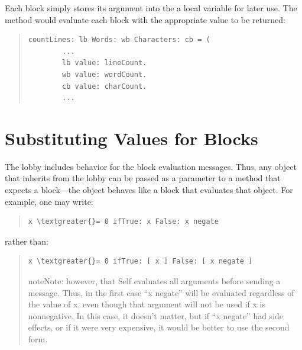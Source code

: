 \documentclass[letterpaper,10pt,english]{sphinxmanual}
\begin{document}
Each block simply stores its argument into the a local variable for later use. The
 method would evaluate each block with the appropriate
value to be returned:
\begin{quote}

\begin{Verbatim}[commandchars=\\\{\}]
countLines: lb Words: wb Characters: cb = (
        ...
        lb value: lineCount.
        wb value: wordCount.
        cb value: charCount.
        ...
\end{Verbatim}
\end{quote}


\section{Substituting Values for Blocks}
\label{progguid:substituting-values-for-blocks}
The lobby includes behavior for the block evaluation messages. Thus, any object that inherits from
the lobby can be passed as a parameter to a method that expects a block—the object behaves like
a block that evaluates that object. For example, one may write:
\begin{quote}

\begin{Verbatim}[commandchars=\\\{\}]
x \textgreater{}= 0 ifTrue: x False: x negate
\end{Verbatim}
\end{quote}

rather than:
\begin{quote}

\begin{Verbatim}[commandchars=\\\{\}]
x \textgreater{}= 0 ifTrue: [ x ] False: [ x negate ]
\end{Verbatim}

\begin{notice}{note}{Note:}
however, that Self evaluates all arguments before sending a message. Thus, in the first case
“x negate” will be evaluated regardless of the value of x, even though that argument will not be
used if x is nonnegative. In this case, it doesn’t matter, but if “x negate” had side effects, or if it
were very expensive, it would be better to use the second form.
\end{notice}
\end{quote}
\end{document}
